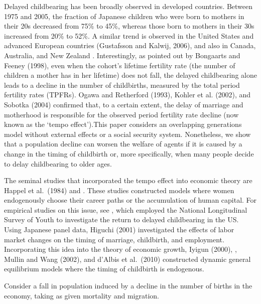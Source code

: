 \documentclass{MBE}%
\begin{document}
{Delayed childbearing has been broadly observed in developed countries. Between 1975 and 2005, the
fraction of Japanese children who were born to mothers in their 20s decreased from 75\% to 45\%,
whereas those born to mothers in their 30s increased from 20\% to 52\%. A similar trend is
observed in the United States and advanced European countries (Gustafsson and Kalwij, 2006), and
also in Canada, Australia, and New Zealand
\citet{Vandenkoornhuyse_Baldauf_Leyval_Straczek_Young:2002}. Interestingly, as pointed out by
Bongaarts and Feeney (1998), even when the cohort's lifetime fertility rate (the number of
children a mother has in her lifetime) does not fall, the delayed childbearing alone leads to a
decline in the number of childbirths, measured by the total period fertility rates (TPFRs). Ogawa
and Retherford (1993), Kohler et al. (2002), and Sobotka (2004) confirmed that, to a certain
extent, the delay of marriage and motherhood is responsible for the observed period fertility rate
decline (now known as the `tempo effect').This paper considers an overlapping generations model
without external effects or a social security system. Nonetheless, we show that a population
decline can worsen the welfare of agents if it is caused by a change in the timing of childbirth
or, more specifically, when many people decide to delay childbearing to older ages.


The seminal studies that incorporated the tempo effect into economic theory are Happel et al.\
(1984) and \citep{Zucker_Mathews_Turner:1999}. These studies constructed models where women
endogenously choose their career paths or the accumulation of human capital. {For empirical
studies on this issue, see \citep{Penny_Hendy:1985}, which employed the National Longitudinal
Survey of Youth to investigate the return to delayed childbearing in the US. Using Japanese panel
data, Higuchi (2001) investigated the effects of labor market changes on the timing of marriage,
childbirth, and employment.} Incorporating this idea into the theory of economic growth, Iyigun
(2000), \citet{Huber:2004}, Mullin and Wang (2002), and d'Albis et al.\ (2010) constructed dynamic
general equilibrium models where
the timing of childbirth is endogenous.%
\begin{arabiclist}
\item Consider a fall in population induced by a decline in the number of births in the economy,
taking as given mortality and migration.


\end{arabiclist}}
\end{document}
